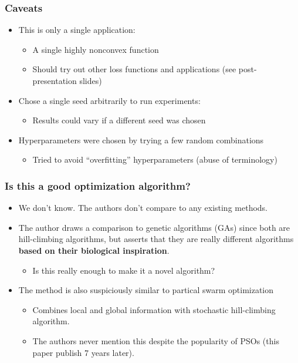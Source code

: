 \documentclass{beamer}
\begin{document}
\begin{frame}
\frametitle{Caveats}
\begin{itemize}
  \item<1-> This is only a single application:
  \begin{itemize}
    \item<1-> A single highly nonconvex function
    \item<1-> Should try out other loss functions and applications (see post-presentation slides)
  \end{itemize}
  \item<2-> Chose a single seed arbitrarily to run experiments:
  \begin{itemize}
    \item<2-> Results could vary if a different seed was chosen
  \end{itemize}
  \item<3-> Hyperparameters were chosen by trying a few random combinations
  \begin{itemize}
    \item<3-> Tried to avoid ``overfitting'' hyperparameters (abuse of terminology)
  \end{itemize}
\end{itemize}
\end{frame}

\begin{frame}
\frametitle{Is this a good optimization algorithm?}
\begin{itemize}
  \item<1-> We don't know. The authors don't compare to any existing methods.
  \item<2-> The author draws a comparison to genetic algorithms (GAs) since both are hill-climbing algorithms, but asserts that they are really different algorithms \textbf{based on their biological inspiration}.
  \begin{itemize}
    \item<2-> Is this really enough to make it a novel algorithm?
  \end{itemize}
  \item<3-> The method is also suspiciously similar to partical swarm optimization
  \begin{itemize}
    \item<4-> Combines local and global information with stochastic hill-climbing algorithm.
    \item<4-> The authors never mention this despite the popularity of PSOs (this paper publish 7 years later).
  \end{itemize}
\end{itemize}
\end{frame}
\end{document}
